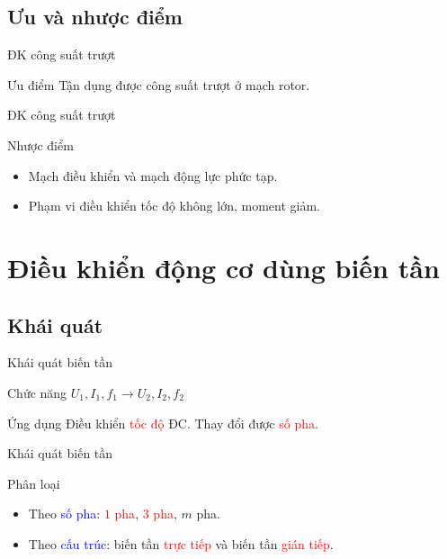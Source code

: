 \documentclass[24pt]{beamer}
\newcommand{\noibat}[1]{\textcolor{red}{#1}}
\begin{document}
\subsection*{Ưu và nhược điểm}
\begin{frame}{ĐK công suất trượt}
\begin{block}{Ưu điểm}
\justifying
		Tận dụng được công suất trượt ở mạch rotor.
	\end{block}
\end{frame}

\begin{frame}{ĐK công suất trượt}
	\begin{block}{Nhược điểm}
		\begin{itemize}
		\justifying
			\item Mạch điều khiển và mạch động lực phức tạp.
			\item Phạm vi điều khiển tốc độ không lớn, moment giảm.
		\end{itemize}
	\end{block}
\end{frame}
\section[Biến tần]{Điều khiển động cơ dùng biến tần}
\subsection*{Khái quát}
\begin{frame}{Khái quát biến tần}
	\begin{block}{Chức năng}	
		$U_1, I_1, f_1 \longrightarrow U_2, I_2, f_2$
	\end{block}
	
	\begin{block}{Ứng dụng}	
	\justifying
		Điều khiển \noibat{tốc độ} ĐC. Thay đổi được \noibat{số pha}.
	\end{block}
\end{frame}

\begin{frame}{Khái quát biến tần}
	\begin{block}{Phân loại}
		\begin{itemize}
		\justifying
			\item Theo \textcolor{blue}{số pha}: \noibat{$1$ pha}, \noibat{$3$ pha}, $m$ pha.
			\item Theo \textcolor{blue}{cấu trúc}: biến tần \noibat{trực tiếp} và biến tần \noibat{gián tiếp}.
		\end{itemize}
	\end{block}
\end{frame}
\end{document}
